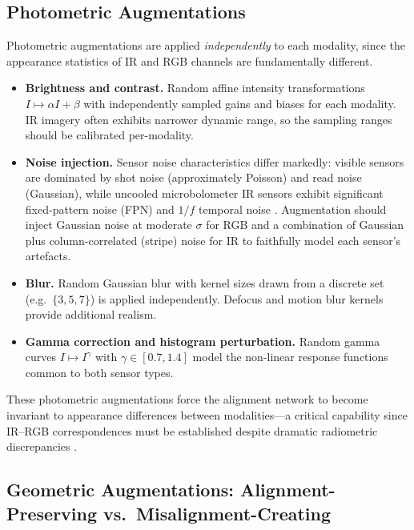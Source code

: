 \subsection{Photometric Augmentations}
\label{subsec:photometric}

Photometric augmentations are applied \emph{independently} to each modality,
since the appearance statistics of IR and RGB channels are fundamentally
different.

\begin{itemize}
    \item \textbf{Brightness and contrast.}  Random affine intensity
          transformations $I \mapsto \alpha I + \beta$ with independently
          sampled gains and biases for each modality.  IR imagery often
          exhibits narrower dynamic range, so the sampling ranges should be
          calibrated per-modality.
    \item \textbf{Noise injection.}  Sensor noise characteristics differ
          markedly: visible sensors are dominated by shot noise (approximately
          Poisson) and read noise (Gaussian), while uncooled microbolometer IR
          sensors exhibit significant fixed-pattern noise (FPN) and $1/f$
          temporal noise \cite{nugent2013infrared}.  Augmentation should
          inject Gaussian noise at moderate $\sigma$ for RGB and a combination
          of Gaussian plus column-correlated (stripe) noise for IR to
          faithfully model each sensor's artefacts.
    \item \textbf{Blur.}  Random Gaussian blur with kernel sizes drawn from a
          discrete set (e.g.\ $\{3,5,7\}$) is applied independently.
          Defocus and motion blur kernels provide additional realism.
    \item \textbf{Gamma correction and histogram perturbation.}  Random gamma
          curves $I \mapsto I^{\gamma}$ with $\gamma \in [0.7, 1.4]$ model
          the non-linear response functions common to both sensor types.
\end{itemize}

These photometric augmentations force the alignment network to become invariant
to appearance differences between modalities---a critical capability since
IR--RGB correspondences must be established despite dramatic radiometric
discrepancies \cite{aguilera2016learning}.

\subsection{Geometric Augmentations: Alignment-Preserving vs.\ Misalignment-Creating}
\label{subsec:geometric_augmentations}

